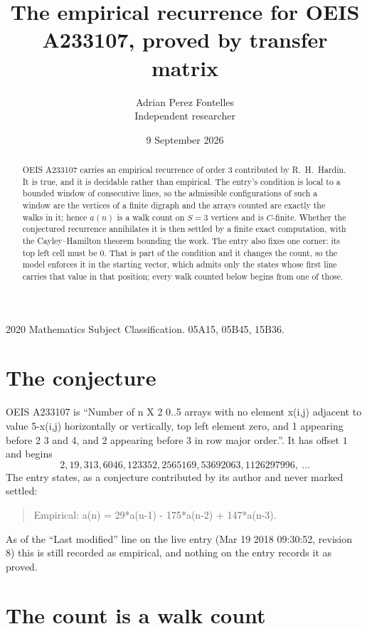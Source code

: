 \documentclass[11pt,a4paper]{article}
\title{The empirical recurrence for OEIS A233107, proved by transfer matrix}
\author{Adrian Perez Fontelles\\ \small Independent researcher}
\date{9 September 2026}
\theoremstyle{plain}
\theoremstyle{definition}
\begin{document}
\maketitle

\begin{abstract}
OEIS A233107 carries an empirical recurrence of order $3$ contributed by R.~H.~Hardin. It is
true, and it is decidable rather than empirical. The entry's condition is local to a bounded window of consecutive lines, so
the admissible configurations of such a window are the vertices of a finite digraph and the
arrays counted are exactly the walks in it; hence $a(n)$ is a walk count on $S=3$ vertices
and is $C$-finite. Whether the conjectured recurrence annihilates it is then settled by a
finite exact computation, with the Cayley--Hamilton theorem bounding the work.
 The entry also fixes one corner: its top left cell must be $0$. That is part of the condition and it changes the count, so the model enforces it in the starting vector, which admits only the states whose first line carries that value in that position; every walk counted below begins from one of those.\end{abstract}

\noindent\small 2020 Mathematics Subject Classification. 05A15, 05B45, 15B36.\normalsize

\section{The conjecture}

OEIS A233107 is ``Number of n X 2 0..5 arrays with no element x(i,j) adjacent to value 5-x(i,j) horizontally or vertically, top left element zero, and 1 appearing before 2 3 and 4, and 2 appearing before 3 in row major order.''. It has offset $1$ and begins
\[
2, 19, 313, 6046, 123352, 2565169, 53692063, 1126297996,\ \dots
\]
The entry states, as a conjecture contributed by its author and never marked settled:
\begin{quote}
Empirical: a(n) = 29*a(n-1) - 175*a(n-2) + 147*a(n-3).
\end{quote}
As of the ``Last modified'' line on the live entry (Mar 19 2018 09:30:52, revision 8) this is still
recorded as empirical, and nothing on the entry records it as proved.

\section{The count is a walk count}
\end{document}

